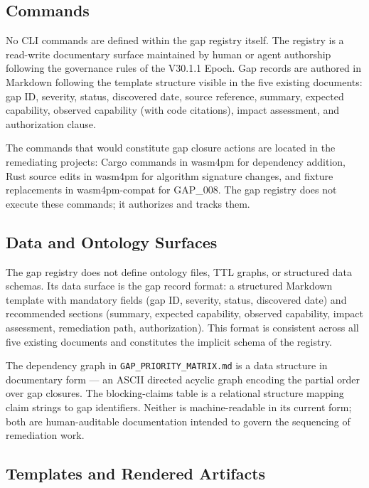 \subsection{Commands}
\label{sec:gaps-implementation-commands}

No CLI commands are defined within the gap registry itself. The registry is a read-write
documentary surface maintained by human or agent authorship following the governance
rules of the V30.1.1 Epoch. Gap records are authored in Markdown following the
template structure visible in the five existing documents: gap ID, severity, status,
discovered date, source reference, summary, expected capability, observed capability
(with code citations), impact assessment, and authorization clause.

The commands that would constitute gap closure actions are located in the remediating
projects: Cargo commands in wasm4pm for dependency addition, Rust source edits in
wasm4pm for algorithm signature changes, and fixture replacements in wasm4pm-compat for
GAP\_008. The gap registry does not execute these commands; it authorizes and tracks them.

\subsection{Data and Ontology Surfaces}
\label{sec:gaps-implementation-data}

The gap registry does not define ontology files, TTL graphs, or structured data schemas.
Its data surface is the gap record format: a structured Markdown template with mandatory
fields (gap ID, severity, status, discovered date) and recommended sections
(summary, expected capability, observed capability, impact assessment, remediation path,
authorization). This format is consistent across all five existing documents and
constitutes the implicit schema of the registry.

The dependency graph in \texttt{GAP\_PRIORITY\_MATRIX.md} is a data structure in
documentary form — an ASCII directed acyclic graph encoding the partial order over gap
closures. The blocking-claims table is a relational structure mapping claim strings to
gap identifiers. Neither is machine-readable in its current form; both are human-auditable
documentation intended to govern the sequencing of remediation work.

\subsection{Templates and Rendered Artifacts}
\label{sec:gaps-implementation-templates}

